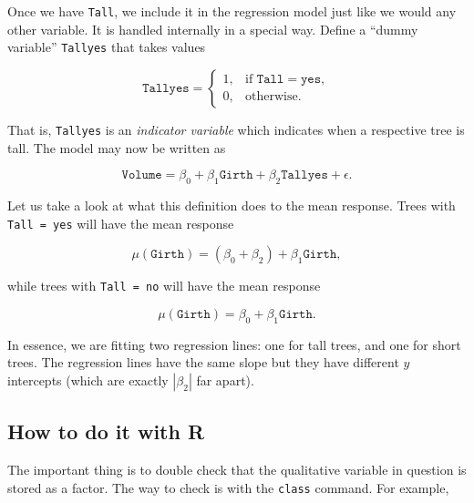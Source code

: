 \documentclass[]{book}
\newenvironment{Shaded}{\begin{snugshade}}{\end{snugshade}}
\newcommand{\KeywordTok}[1]{\textcolor[rgb]{0.13,0.29,0.53}{\textbf{{#1}}}}
\newcommand{\NormalTok}[1]{{#1}}
\numberwithin{equation}{chapter}
\numberwithin{figure}{chapter}
\theoremstyle{plain}
\theoremstyle{definition}
\theoremstyle{remark}
\theoremstyle{definition}
\theoremstyle{definition}
\theoremstyle{remark}
\begin{document}
Once we have \texttt{Tall}, we include it in the regression model just
like we would any other variable. It is handled internally in a special
way. Define a ``dummy variable'' \texttt{Tallyes} that takes values

\begin{equation} \mathtt{Tallyes} = \begin{cases} 1, & \mbox{if }\mathtt{Tall}=\mathtt{yes},\\ 0, & \mbox{otherwise.} \end{cases} \end{equation}

That is, \texttt{Tallyes} is an \emph{indicator variable} which
indicates when a respective tree is tall. The model may now be written
as

\begin{equation}
\mathtt{Volume}=\beta_{0}+\beta_{1}\mathtt{Girth}+\beta_{2}\mathtt{Tallyes}+\epsilon.
\end{equation}

Let us take a look at what this definition does to the mean response.
Trees with \texttt{Tall\ =\ yes} will have the mean response

\begin{equation}
\mu(\mathtt{Girth})=(\beta_{0}+\beta_{2})+\beta_{1}\mathtt{Girth},
\end{equation}

while trees with \texttt{Tall\ =\ no} will have the mean response

\begin{equation} 
\mu(\mathtt{Girth})=\beta_{0}+\beta_{1}\mathtt{Girth}.
\end{equation}

In essence, we are fitting two regression lines: one for tall trees, and
one for short trees. The regression lines have the same slope but they
have different \(y\) intercepts (which are exactly \(|\beta_{2}|\) far
apart).

\subsection{How to do it with R}\label{how-to-do-it-with-r-43}

The important thing is to double check that the qualitative variable in
question is stored as a factor. The way to check is with the
\texttt{class} command. For example,

\begin{Shaded}
\end{Shaded}
\end{document}
